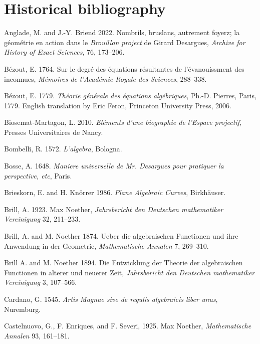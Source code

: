 \section{Historical bibliography}

\frenchspacing
\def\newline{\par\hangindent=10pt\hangafter=1}
\parindent=0pt %
\small
\newline
\indent Anglade, M. and J.-Y. Briend 2022. Nombrils, bruslans, autrement foyerz; la g\'eom\'etrie en action dans le \emph{Brouillon project} de Girard Desargues, \emph{Archive for History of Exact Sciences}, 76, 173--206.
\newline\indent B\'ezout, E. 1764. Sur le degr\'e des \'equations r\'esultantes de l'\'evanouissment des inconnues, \emph{M\'emoires de l'Acad\'emie Royale des Sciences}, 288--338.
\newline\indent B\'ezout, E. 1779. \emph{Th\'eorie g\'en\'erale des \'equations alg\'ebriques}, Ph.-D. Pierres, Paris, 1779. English translation by Eric Feron, Princeton University Press, 2006.
\newline\indent  Biosemat-Martagon, L. 2010. \emph{El\'ements d'une biographie de l'Espace projectif}, Presses Universitaires de Nancy.
\newline\indent Bombelli, R. 1572. \emph{L'algebra}, Bologna.
\newline\indent Bosse, A.  1648. \emph{Maniere universelle de Mr. Desargues pour pratiquer la perspective, etc}, Paris.
\newline\indent Brieskorn, E. and  H. Kn\"orrer 1986. \emph{Plane Algebraic Curves}, Birkh\"auser.
\newline\indent Brill, A. 1923. Max Noether, \emph{Jahrsbericht den Deutschen mathematiker Vereinigung} 32, 211--233.
\newline\indent Brill, A. and M. Noether  1874.  Ueber die algebraischen Functionen und ihre Anwendung in der Geometrie, \emph{Mathematische Annalen} 7, 269--310.
\newline\indent Brill A. and M. Noether 1894.  Die Entwicklung der Theorie der algebraischen Functionen in alterer und neuerer Zeit, \emph{Jahrsbericht den Deutschen mathematiker Vereinigung} 3, 107--566.
\newline\indent Cardano, G. 1545.  \emph{Artis Magnae sive de regulis algebraicis liber unus}, Nuremburg. 
\newline\indent Castelnuovo, G., F. Enriques, and F. Severi, 1925. Max Noether, \emph{Mathematische Annalen} 93, 161--181.
